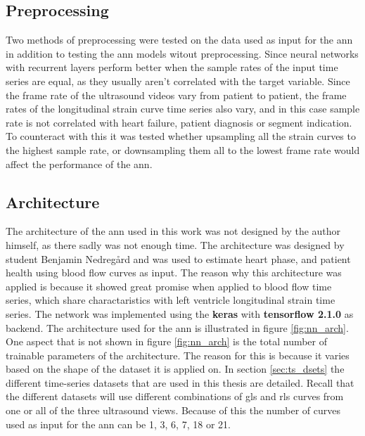 \subsection{Preprocessing}

Two methods of preprocessing were tested on the data used as input for the \acrshort{ann} in addition to testing the \acrshort{ann} models witout preprocessing. Since neural networks with recurrent layers perform better when the sample rates of the input time series are equal, as they usually aren't correlated with the target variable. Since the frame rate of the ultrasound videos vary from patient to patient, the frame rates of the longitudinal strain curve time series also vary, and in this case sample rate is not correlated with heart failure, patient diagnosis or segment indication. To counteract with this it was tested whether upsampling all the strain curves to the highest sample rate, or downsampling them all to the lowest frame rate would affect the performance of the \acrshort{ann}. 

\subsection{Architecture} \label{sec:ann_architecture}

The architecture of the \acrshort{ann} used in this work was not designed by the author himself, as there sadly was not enough time. The architecture was designed by student Benjamin Nedregård and was used to estimate heart phase, and patient health using blood flow curves as input. The reason why this architecture was applied is because it showed great promise when applied to blood flow time series, which share charactaristics with left ventricle longitudinal strain time series. The network was implemented using the \textbf{keras} with \textbf{tensorflow 2.1.0} as backend. The architecture used for the \acrshort{ann} is illustrated in figure \ref{fig:nn_arch}. One aspect that is not shown in figure \ref{fig:nn_arch} is the total number of trainable parameters of the architecture. The reason for this is because it varies based on the shape of the dataset it is applied on. In section \ref{sec:ts_dsets} the different time-series datasets that are used in this thesis are detailed. Recall that the different datasets will use different combinations of \acrshort{gls} and \acrshort{rls} curves from one or all of the three ultrasound views. Because of this the number of curves used as input for the \acrshort{ann} can be 1, 3, 6, 7, 18 or 21.

